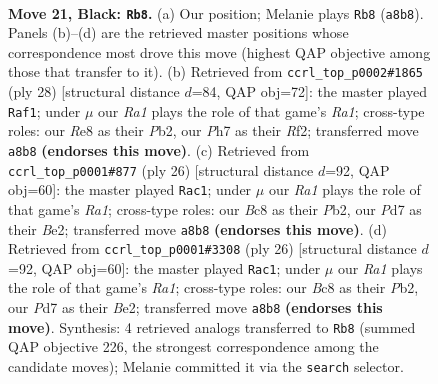 \documentclass[11pt]{article}
\begin{document}
\clearpage

\begin{figure}[p]\centering
\begin{subfigure}{0.46\textwidth}\centering
\resizebox{\linewidth}{!}{%
\newchessgame
\chessboard[
  setfen={r1bnrk2/1ppp1ppp/p2q4/B2P4/4n3/4PNP1/PP2RP1P/1R1Q1BK1 b - - 18 21},
  showmover=false,
  pgfstyle=straightmove, color=movearrow, markmove={a8-b8}
]}
\caption{}
\end{subfigure}\hfill
\begin{subfigure}{0.46\textwidth}\centering
\resizebox{\linewidth}{!}{%
\newchessgame
\chessboard[
  setfen={r1b2rk1/ppp1qpp1/3p2np/Q3p3/2B1P3/3PPN2/PPP2RPP/R5K1 w - - 2 15},
  showmover=false,
  pgfstyle=straightmove, color=movearrow, markmove={a1-f1}
]}
\caption{}
\end{subfigure}
\\[4pt]
\begin{subfigure}{0.46\textwidth}\centering
\resizebox{\linewidth}{!}{%
\newchessgame
\chessboard[
  setfen={r1b2rk1/pp1nqpp1/2p4p/4p3/2QP4/4PN2/PP2BPPP/R4RK1 w - - 0 14},
  showmover=false,
  pgfstyle=straightmove, color=movearrow, markmove={a1-c1}
]}
\caption{}
\end{subfigure}\hfill
\begin{subfigure}{0.46\textwidth}\centering
\resizebox{\linewidth}{!}{%
\newchessgame
\chessboard[
  setfen={r1b2rk1/pp1nqpp1/2p4p/4p3/2QP4/4PN2/PP2BPPP/R4RK1 w - - 0 14},
  showmover=false,
  pgfstyle=straightmove, color=movearrow, markmove={a1-c1}
]}
\caption{}
\end{subfigure}
\caption{\textbf{Move 21, Black: \texttt{Rb8}.} (a) Our position; Melanie plays \texttt{Rb8} (\texttt{a8b8}). Panels (b)--(d) are the retrieved master positions whose correspondence most drove this move (highest QAP objective among those that transfer to it). (b) Retrieved from \texttt{ccrl\_top\_p0002\#1865} (ply 28) [structural distance $d$=84, QAP obj=72]: the master played \texttt{Raf1}; under $\mu$ our \emph{Ra1} plays the role of that game's \emph{Ra1}; cross-type roles: our \emph{R}e8 as their \emph{P}b2, our \emph{P}h7 as their \emph{R}f2; transferred move \texttt{a8b8} \textbf{(endorses this move)}. (c) Retrieved from \texttt{ccrl\_top\_p0001\#877} (ply 26) [structural distance $d$=92, QAP obj=60]: the master played \texttt{Rac1}; under $\mu$ our \emph{Ra1} plays the role of that game's \emph{Ra1}; cross-type roles: our \emph{B}c8 as their \emph{P}b2, our \emph{P}d7 as their \emph{B}e2; transferred move \texttt{a8b8} \textbf{(endorses this move)}. (d) Retrieved from \texttt{ccrl\_top\_p0001\#3308} (ply 26) [structural distance $d$=92, QAP obj=60]: the master played \texttt{Rac1}; under $\mu$ our \emph{Ra1} plays the role of that game's \emph{Ra1}; cross-type roles: our \emph{B}c8 as their \emph{P}b2, our \emph{P}d7 as their \emph{B}e2; transferred move \texttt{a8b8} \textbf{(endorses this move)}. Synthesis: 4 retrieved analogs transferred to \texttt{Rb8} (summed QAP objective 226, the strongest correspondence among the candidate moves); Melanie committed it via the \texttt{search} selector.}
\label{fig:thought-m41}
\end{figure}
\end{document}
